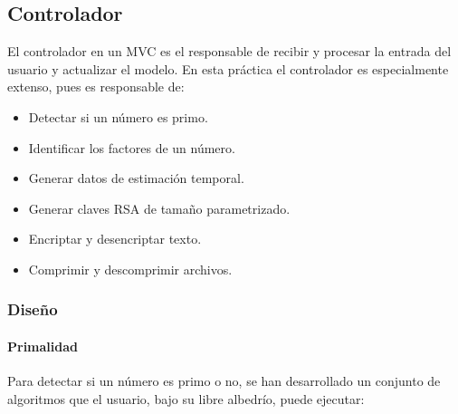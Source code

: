 \subsection{Controlador}
El controlador en un MVC es el responsable de recibir y procesar la entrada del usuario y actualizar el modelo. En esta práctica el controlador es especialmente extenso, pues es responsable de: \begin{itemize}
    \item Detectar si un número es primo.
    \item Identificar los factores de un número.
    \item Generar datos de estimación temporal.
    \item Generar claves RSA de tamaño parametrizado.
    \item Encriptar y desencriptar texto.
    \item Comprimir y descomprimir archivos.
\end{itemize}

\subsubsection{Diseño}
\paragraph{Primalidad}\label{sec:primality}
Para detectar si un número es primo o no, se han desarrollado un conjunto de algoritmos que el usuario, bajo su libre albedrío, puede ejecutar:\\

